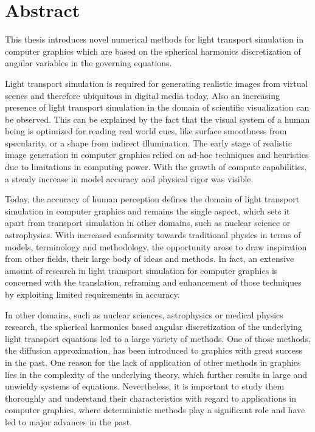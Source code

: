 \chapter*{Abstract}
%
%
This thesis introduces novel numerical methods for light transport simulation in computer graphics which are based on the spherical harmonics discretization of angular variables in the governing equations.

Light transport simulation is required for generating realistic images from virtual scenes and therefore ubiquitous in digital media today. Also an increasing presence of light transport simulation in the domain of scientific visualization can be observed. This can be explained by the fact that the visual system of a human being is optimized for reading real world cues, like surface smoothness from specularity, or a shape from indirect illumination. The early stage of realistic image generation in computer graphics relied on ad-hoc techniques and heuristics due to limitations in computing power. With the growth of compute capabilities, a steady increase in model accuracy and physical rigor was visible.

Today, the accuracy of human perception defines the domain of light transport simulation in computer graphics and remains the single aspect, which sets it apart from transport simulation in other domains, such as nuclear science or astrophysics. With increased conformity towards traditional physics in terms of models, terminology and methodology, the opportunity arose to draw inspiration from other fields, their large body of ideas and methods. In fact, an extensive amount of research in light transport simulation for computer graphics is concerned with the translation, reframing and enhancement of those techniques by exploiting limited requirements in accuracy.

In other domains, such as nuclear sciences, astrophysics or medical physics research, the spherical harmonics based angular discretization of the underlying light transport equations led to a large variety of methods. One of those methods, the diffusion approximation, has been introduced to graphics with great success in the past. One reason for the lack of application of other methods in graphics lies in the complexity of the underlying theory, which further results in large and unwieldy systems of equations. Nevertheless, it is important to study them thoroughly and understand their characteristics with regard to applications in computer graphics, where deterministic methods play a significant role and have led to major advances in the past.

